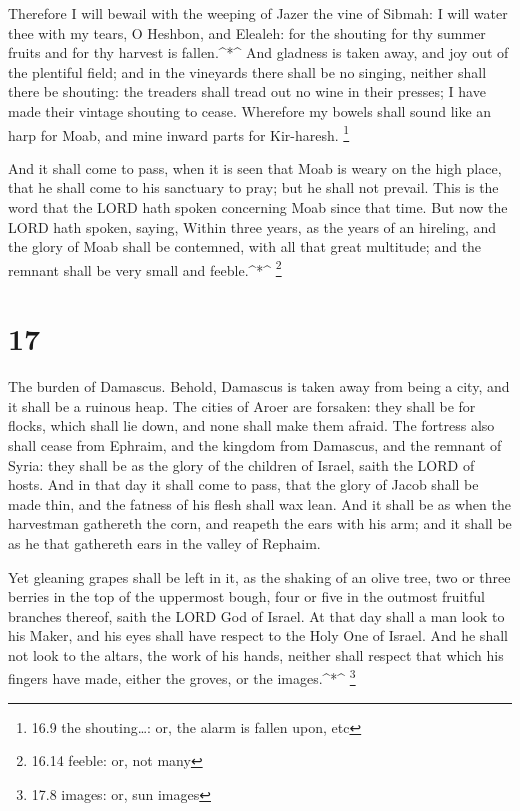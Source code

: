  Therefore I will bewail with the weeping of Jazer the vine
of Sibmah: I will water thee with my tears, O Heshbon, and Elealeh: for
the shouting for thy summer fruits and for thy harvest is
fallen.\^{}*\^{}  And gladness is taken away, and joy out
of the plentiful field; and in the vineyards there shall be no singing,
neither shall there be shouting: the treaders shall tread out no wine in
their presses; I have made their vintage shouting to cease.
 Wherefore my bowels shall sound like an harp for Moab, and
mine inward parts for Kir-haresh. \footnote{16.9 the shouting\ldots: or,
  the alarm is fallen upon, etc}

 And it shall come to pass, when it is seen that Moab is
weary on the high place, that he shall come to his sanctuary to pray;
but he shall not prevail.  This is the word that the LORD
hath spoken concerning Moab since that time.  But now the
LORD hath spoken, saying, Within three years, as the years of an
hireling, and the glory of Moab shall be contemned, with all that great
multitude; and the remnant shall be very small and feeble.\^{}*\^{}
\footnote{16.14 feeble: or, not many}

\hypertarget{section-16}{%
\section{17}\label{section-16}}

 The burden of Damascus. Behold, Damascus is taken away from
being a city, and it shall be a ruinous heap.  The cities of
Aroer are forsaken: they shall be for flocks, which shall lie down, and
none shall make them afraid.  The fortress also shall cease
from Ephraim, and the kingdom from Damascus, and the remnant of Syria:
they shall be as the glory of the children of Israel, saith the LORD of
hosts.  And in that day it shall come to pass, that the
glory of Jacob shall be made thin, and the fatness of his flesh shall
wax lean.  And it shall be as when the harvestman gathereth
the corn, and reapeth the ears with his arm; and it shall be as he that
gathereth ears in the valley of Rephaim.

 Yet gleaning grapes shall be left in it, as the shaking of
an olive tree, two or three berries in the top of the uppermost bough,
four or five in the outmost fruitful branches thereof, saith the LORD
God of Israel.  At that day shall a man look to his Maker,
and his eyes shall have respect to the Holy One of Israel. 
And he shall not look to the altars, the work of his hands, neither
shall respect that which his fingers have made, either the groves, or
the images.\^{}*\^{} \footnote{17.8 images: or, sun images}

